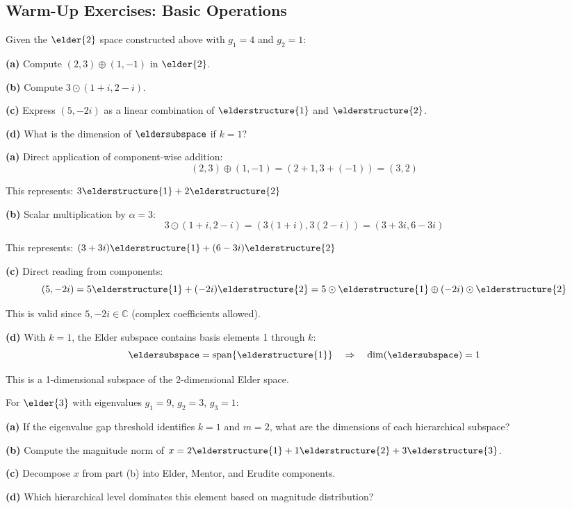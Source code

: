 \subsection{Warm-Up Exercises: Basic Operations}

\begin{warmup}
Given the $\elder{2}$ space constructed above with $g_1 = 4$ and $g_2 = 1$:

\textbf{(a)} Compute $(2,3) \oplus (1, -1)$ in $\elder{2}$.

\textbf{(b)} Compute $3 \odot (1+i, 2-i)$.

\textbf{(c)} Express $(5, -2i)$ as a linear combination of $\elderstructure{1}$ and $\elderstructure{2}$.

\textbf{(d)} What is the dimension of $\eldersubspace$ if $k=1$?
\end{warmup}

\begin{solution}
\textbf{(a)} Direct application of component-wise addition:
$$(2,3) \oplus (1,-1) = (2+1, 3+(-1)) = (3, 2)$$

This represents: $3\elderstructure{1} + 2\elderstructure{2}$

\textbf{(b)} Scalar multiplication by $\alpha = 3$:
$$3 \odot (1+i, 2-i) = (3(1+i), 3(2-i)) = (3+3i, 6-3i)$$

This represents: $(3+3i)\elderstructure{1} + (6-3i)\elderstructure{2}$

\textbf{(c)} Direct reading from components:
$$(5, -2i) = 5\elderstructure{1} + (-2i)\elderstructure{2} = 5 \odot \elderstructure{1} \oplus (-2i) \odot \elderstructure{2}$$

This is valid since $5, -2i \in \mathbb{C}$ (complex coefficients allowed).

\textbf{(d)} With $k=1$, the Elder subspace contains basis elements 1 through $k$:
$$\eldersubspace = \mathrm{span}\{\elderstructure{1}\} \quad \Rightarrow \quad \dim(\eldersubspace) = 1$$

This is a 1-dimensional subspace of the 2-dimensional Elder space.
\end{solution}

\begin{warmup}
For $\elder{3}$ with eigenvalues $g_1 = 9$, $g_2 = 3$, $g_3 = 1$:

\textbf{(a)} If the eigenvalue gap threshold identifies $k=1$ and $m=2$, what are the dimensions of each hierarchical subspace?

\textbf{(b)} Compute the magnitude norm of $x = 2\elderstructure{1} + 1\elderstructure{2} + 3\elderstructure{3}$.

\textbf{(c)} Decompose $x$ from part (b) into Elder, Mentor, and Erudite components.

\textbf{(d)} Which hierarchical level dominates this element based on magnitude distribution?
\end{warmup}

